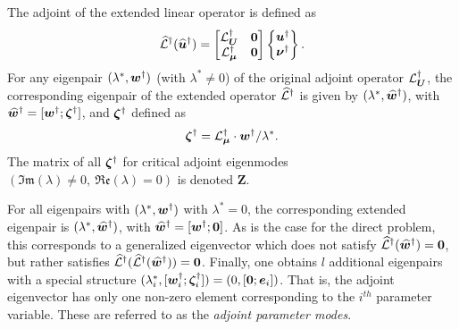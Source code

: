 The adjoint of the extended linear operator is defined as 
\begin{eqnarray}
	\mathcal{\widehat{L}}^{\dagger}({\widehat{\boldsymbol{u}}}^{\dagger}) =
	\begin{bmatrix}
		\mathcal{L}_{\boldsymbol{U}}^{\dagger} 		& \mathbf{0} \\
		\mathcal{L}_{\boldsymbol{\mu}}^{\dagger}	 & \mathbf{0}
	\end{bmatrix}
	\begin{Bmatrix}
		\boldsymbol{u}^{\dagger} \\
		\boldsymbol{\nu}^{\dagger}
	\end{Bmatrix}
\label{eqn:adjoint_operator_extended}.
\end{eqnarray}
For any eigenpair $(\lambda^{*},\boldsymbol{w}^{\dagger})$ (with $\lambda^{*}\ne 0$) of the original adjoint operator $\mathcal{L}_{\boldsymbol{U}}^{\dagger}$, the corresponding eigenpair of the extended operator $\mathcal{\widehat{L}}^{\dagger}$ is given by $(\lambda^{*}, {\widehat{\boldsymbol{w}}}^{\dagger})$, with ${\widehat{\boldsymbol{w}}}^{\dagger} = [\boldsymbol{w}^{\dagger}; \boldsymbol{\zeta}^{\dagger}]$, and  $\boldsymbol{\zeta}^{\dagger}$ defined as
\begin{eqnarray}
	\label{eqn:extended_adjoint_eigenvector}
	\boldsymbol{\zeta}^{\dagger} = \mathcal{L}_{\boldsymbol{\mu}}^{\dagger}\cdot\boldsymbol{w}^{\dagger}/\lambda^{*}.
\end{eqnarray}
The matrix of all $\boldsymbol{\zeta}^{\dagger}$ for critical  adjoint eigenmodes $(\mathfrak{Im}(\lambda)\ne 0,\ \mathfrak{Re}(\lambda)=0)$ is denoted $\mathbf{Z}$.

For all eigenpairs with $(\lambda^{*},\boldsymbol{w}^{\dagger})$ with $\lambda^{*} = 0$, the corresponding extended eigenpair is $(\lambda^{*},{\widehat{\boldsymbol{w}}}^{\dagger})$, with ${\widehat{\boldsymbol{w}}}^{\dagger} = [\boldsymbol{w}^{\dagger}; \boldsymbol{0}]$. As is the case for the direct problem, this corresponds to a generalized eigenvector which does not satisfy $\mathcal{\widehat{L}}^{\dagger}({\widehat{\boldsymbol{w}}}^{\dagger}) = \boldsymbol{0}$, but rather satisfies $\mathcal{\widehat{L}}^{\dagger}(\mathcal{\widehat{L}}^{\dagger}({\widehat{\boldsymbol{w}}}^{\dagger})) = \boldsymbol{0}$. Finally, one obtains $l$ additional eigenpairs with a special structure $(\lambda^{*}_{i},[\boldsymbol{w}^{\dagger}_{i};\boldsymbol{\zeta}^{\dagger}_{i}]) = (0,[\boldsymbol{0};\boldsymbol{e}_{i}])$. That is, the adjoint eigenvector has only one non-zero element corresponding to the $i^{th}$ parameter variable. These are referred to as the \emph{adjoint parameter modes}.

